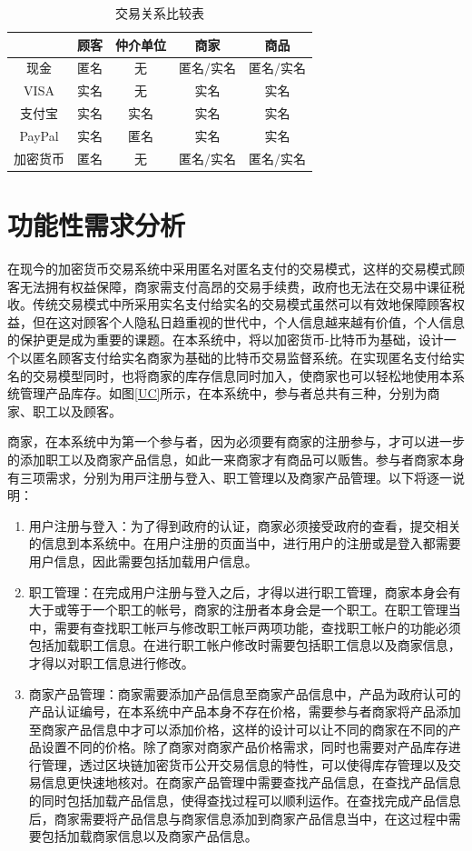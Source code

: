 		\begin{table}[!htbp]
		\centering
		\caption{交易关系比较表}
		\label{txvs}
		\begin{tabular}{|c|c|c|c|c|}
		\hline
		 & 顾客 & 仲介单位 & 商家 & 商品 \\ \hline
		现金 & 匿名 & 无 & 匿名/实名 & 匿名/实名 \\ \hline
		VISA & 实名 & 无 & 实名 & 实名 \\ \hline
		支付宝 & 实名 & 实名 & 实名 & 实名 \\ \hline
		PayPal & 实名 & 匿名 & 实名 & 实名 \\ \hline
		加密货币 & 匿名 & 无 & 匿名/实名 & 匿名/实名 \\ \hline
		\end{tabular}
		\end{table}

\section{功能性需求分析}

在现今的加密货币交易系统中采用匿名对匿名⽀付的交易模式，这样的交易模式顾客无法拥有权益保障，商家需支付高昂的交易手续费，政府也无法在交易中课征税收。传统交易模式中所采用实名⽀付给实名的交易模式虽然可以有效地保障顾客权益，但在这对顾客个⼈隐私⽇趋重视的世代中，个⼈信息越来越有价值，个⼈信息的保护更是成为重要的课题。在本系统中，将以加密货币-⽐特币为基础，设计⼀个以匿名顾客⽀付给实名商家为基础的比特币交易监督系统。在实现匿名⽀付给实名的交易模型同时，也将商家的库存信息同时加⼊，使商家也可以轻松地使用本系统管理产品库存。如图\ref{UC}所示，在本系统中，参与者总共有三种，分别为商家、职⼯以及顾客。

商家，在本系统中为第⼀个参与者，因为必须要有商家的注册参与，才可以进⼀步的添加职⼯以及商家产品信息，如此⼀来商家才有商品可以贩售。参与者商家本⾝有三项需求，分别为⽤⼾注册与登⼊、职⼯管理以及商家产品管理。以下将逐⼀说明：


	\begin{enumerate}
	\item 用户注册与登入：为了得到政府的认证，商家必须接受政府的查看，提交相关的信息到本系统中。在用户注册的页面当中，进行用户的注册或是登入都需要用户信息，因此需要包括加载用户信息。
	\item 职工管理：在完成用户注册与登入之后，才得以进行职工管理，商家本身会有大于或等于一个职工的帐号，商家的注册者本身会是一个职工。在职工管理当中，需要有查找职⼯帐⼾与修改职⼯帐⼾两项功能，查找职工帐户的功能必须包括加载职工信息。在进行职工帐户修改时需要包括职工信息以及商家信息，才得以对职工信息进行修改。
	\item 商家产品管理：商家需要添加产品信息至商家产品信息中，产品为政府认可的产品认证编号，在本系统中产品本身不存在价格，需要参与者商家将产品添加至商家产品信息中才可以添加价格，这样的设计可以让不同的商家在不同的产品设置不同的价格。除了商家对商家产品价格需求，同时也需要对产品库存进行管理，透过区块链加密货币公开交易信息的特性，可以使得库存管理以及交易信息更快速地核对。在商家产品管理中需要查找产品信息，在查找产品信息的同时包括加载产品信息，使得查找过程可以顺利运作。在查找完成产品信息后，商家需要将产品信息与商家信息添加到商家产品信息当中，在这过程中需要包括加载商家信息以及商家产品信息。

	\end{enumerate}


